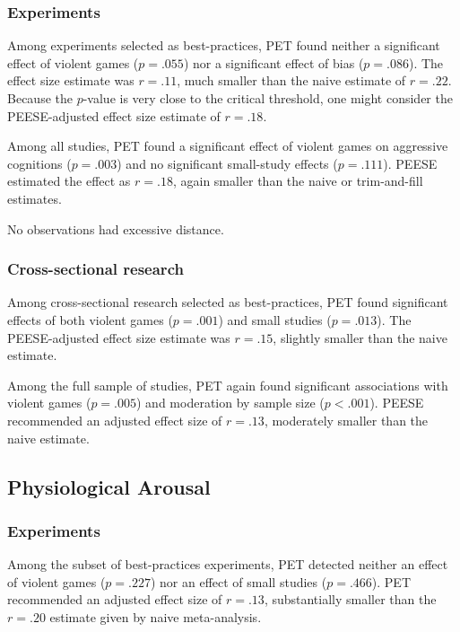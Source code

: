 \documentclass[man]{apa6}
\begin{document}
\subsubsection{Experiments}
Among experiments selected as best-practices, PET found neither a significant effect of violent games ($p = .055$) nor a significant effect of bias ($p = .086$). The effect size estimate was $r = .11$, much smaller than the naive estimate of $r = .22$. Because the $p$-value is very close to the critical threshold, one might consider the PEESE-adjusted effect size estimate of $r = .18$.

Among all studies, PET found a significant effect of violent games on aggressive cognitions ($p = .003$) and no significant small-study effects ($p = .111$). PEESE estimated the effect as $r = .18$, again smaller than the naive or trim-and-fill estimates. 

No observations had excessive distance. 

\subsubsection{Cross-sectional research}
Among cross-sectional research selected as best-practices, PET found significant effects of both violent games ($p = .001$) and small studies ($p = .013$). The PEESE-adjusted effect size estimate was $r = .15$, slightly smaller than the naive estimate.

Among the full sample of studies, PET again found significant associations with violent games ($p = .005$) and moderation by sample size ($p < .001$). PEESE recommended an adjusted effect size of $r = .13$, moderately smaller than the naive estimate.


\subsection{Physiological Arousal}
\subsubsection{Experiments}
Among the subset of best-practices experiments, PET detected neither an effect of violent games ($p = .227$) nor an effect of small studies ($p = .466$). PET recommended an adjusted effect size of $r = .13$, substantially smaller than the $r = .20$ estimate given by naive meta-analysis.
\end{document}
